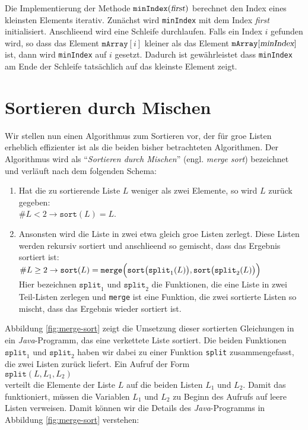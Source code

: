 Die Implementierung der Methode $\texttt{minIndex}(\textsl{first})$ berechnet den Index eines kleinsten
Elements iterativ.  Zun\"achst wird \texttt{minIndex} mit dem Index \textsl{first}
initialisiert.  Anschlie\3end wird eine Schleife durchlaufen.  Falls ein
Index $i$ gefunden wird, so dass das Element $\mathtt{mArray}[i]$ kleiner als das Element
$\texttt{mArray}[\textsl{minIndex}]$ ist, dann wird \texttt{minIndex} auf $i$ gesetzt.
Dadurch ist gew\"ahrleistet dass \texttt{minIndex} am Ende der Schleife tats\"achlich auf das
kleinste Element zeigt.

\section{Sortieren durch Mischen}
Wir stellen nun einen Algorithmus zum Sortieren vor, der f\"ur gro\3e Listen erheblich
effizienter ist als die beiden bisher betrachteten Algorithmen.  Der Algorithmus wird als
``\emph{Sortieren durch Mischen}'' (engl. \emph{merge sort}) bezeichnet und verl\"auft nach dem folgenden Schema:
\begin{enumerate}
\item Hat die zu sortierende Liste $L$ weniger als zwei Elemente, so wird $L$ zur\"uck
      gegeben: \\[0.2cm]
      \hspace*{1.3cm} $\#L < 2 \rightarrow \mathtt{sort}(L) = L$.
\item Ansonsten wird die Liste in zwei etwa gleich gro\3e Listen zerlegt.
      Diese Listen werden rekursiv sortiert und anschlie\3end so gemischt, dass
      das Ergebnis sortiert ist: \\[0.2cm]
      \hspace*{1.3cm} 
 $\#L \geq 2 \rightarrow \mathtt{sort}(L) = \mathtt{merge}\Bigl(\mathtt{sort}\bigl(\mathtt{split}_1(L)\bigr), \mathtt{sort}\bigl(\mathtt{split}_2(L)\bigr)\Bigr)$
     \\[0.2cm]
     Hier bezeichnen $\texttt{split}_1$ und $\mathtt{split}_2$ die Funktionen, die eine Liste in zwei Teil-Listen zerlegen
     und \texttt{merge} ist eine Funktion, die zwei sortierte Listen so mischt, dass das Ergebnis wieder sortiert ist.
\end{enumerate}
Abbildung \ref{fig:merge-sort} zeigt die Umsetzung dieser sortierten Gleichungen 
in ein \textsl{Java}-Programm, das eine verkettete Liste sortiert. 
Die beiden Funktionen $\mathtt{split}_1$ und $\mathtt{split}_2$ haben wir dabei
zu einer Funktion \texttt{split} zusammengefasst, die zwei Listen zur\"uck liefert. Ein
Aufruf der Form
\\[0.2cm]
\hspace*{1.3cm}
$\mathtt{split}(L, L_1, L_2)$
\\[0.2cm]
verteilt die Elemente der Liste $L$ auf die beiden Listen $L_1$ und $L_2$.  
Damit das funktioniert, m\"ussen die Variablen $L_1$ und $L_2$ zu Beginn des Aufrufs auf
leere Listen verweisen.  Damit k\"onnen wir die Details des \textsl{Java}-Programms in
Abbildung \ref{fig:merge-sort} verstehen:



